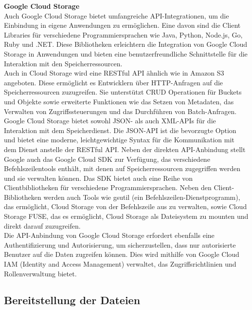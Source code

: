 \newpage

\textbf{Google Cloud Storage}\\

Auch Google Cloud Storage bietet umfangreiche API-Integrationen, um die Einbindung in eigene Anwendungen zu ermöglichen. Eine davon sind die Client Libraries für verschiedene Programmiersprachen wie Java, Python, Node.js, Go, Ruby und .NET. Diese Bibliotheken erleichtern die Integration von Google Cloud Storage in Anwendungen und bieten eine benutzerfreundliche Schnittstelle für die Interaktion mit den Speicherressourcen.\\ Auch in Cloud Storage wird eine RESTful API ähnlich wie in Amazon S3 angeboten. Diese ermöglicht es Entwicklern über HTTP-Anfragen auf die Speicherressourcen zuzugreifen. Sie unterstützt CRUD Operationen für Buckets und Objekte sowie erweiterte Funktionen wie das Setzen von Metadaten, das Verwalten von Zugriffssteuerungen und das Durchführen von Batch-Anfragen.\\

Google Cloud Storage bietet sowohl JSON- als auch XML-APIs für die Interaktion mit dem Speicherdienst. Die JSON-API ist die bevorzugte Option und bietet eine moderne, leichtgewichtige Syntax für die Kommunikation mit dem Dienst anstelle der RESTful API. Neben der direkten API-Anbindung stellt Google auch das Google Cloud SDK zur Verfügung, das verschiedene Befehlszeilentools enthält, mit denen auf Speicherressourcen zugegriffen werden und sie verwalten können. Das SDK bietet auch eine Reihe von Clientbibliotheken für verschiedene Programmiersprachen. Neben den Client-Bibliotheken werden auch Tools wie gsutil (ein Befehlszeilen-Dienstprogramm), das ermöglicht, Cloud Storage von der Befehlszeile aus zu verwalten, sowie Cloud Storage FUSE, das es ermöglicht, Cloud Storage als Dateisystem zu mounten und direkt darauf zuzugreifen.\\

Die API-Anbindung von Google Cloud Storage erfordert ebenfalls eine Authentifizierung und Autorisierung, um sicherzustellen, dass nur autorisierte Benutzer auf die Daten zugreifen können. Dies wird mithilfe von Google Cloud IAM (Identity and Access Management) verwaltet, das Zugriffsrichtlinien und Rollenverwaltung bietet.

\newpage

\subsection{Bereitstellung der Dateien}

